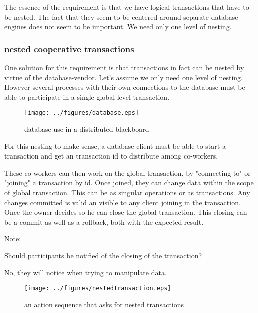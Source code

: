 \documentclass[]{lofar}
\begin{document}
      The essence of the requirement is that we have logical
      transactions that have to be nested. The fact that they seem to
      be centered around separate database-engines does not seem to be
      important. We need only one level of nesting.

      \subsubsection{nested cooperative transactions}
      \label{subsubsec:nested-cooperative-transaction}\hypertarget{subsubsec:nested-cooperative-transaction}{}%

        One solution for this requirement is that transactions in fact
        can be nested by virtue of the database-vendor. Let's assume
        we only need one level of nesting. However several processes
        with their own connections to the database must be able to
        participate in a single global level transaction.

        \begin{figure}
          \texttt{[image: ../figures/database.eps]}
          \hypertarget{fig:database}{}
          \caption{database use in a distributed blackboard\label{fig:database}}
        \end{figure}

        For this nesting to make sense, a database client must be able
        to start a transaction and get an transaction id to distribute
        among co-workers.

        These co-workers can then work on the global transaction, by
        "connecting to" or "joining" a transaction by id. Once joined,
        they can change data within the scope of global
        transaction. This can be as singular operations or as
        transactions. Any changes committed is valid an visible to any
        client joining in the transaction. Once the owner decides so
        he can close the global transaction. This closing can be a
        commit as well as a rollback, both with the expected result.
     
        \begin{em}\large{Note: }

          Should participants be notified of the closing of the transaction?

          No, they will notice when trying to manipulate data.

        \end{em}

        \begin{figure}
          \texttt{[image: ../figures/nestedTransaction.eps]}
          \hypertarget{fig:nestedTransaction}{}
          \caption{an action sequence that asks for nested transactions\label{fig:nestedTransactions}}
        \end{figure}
\end{document}
